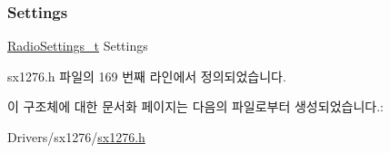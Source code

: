 \subsubsection{\texorpdfstring{Settings}{Settings}}
{\footnotesize\ttfamily \mbox{\hyperlink{struct_radio_settings__t}{Radio\+Settings\+\_\+t}} Settings}



sx1276.\+h 파일의 169 번째 라인에서 정의되었습니다.



이 구조체에 대한 문서화 페이지는 다음의 파일로부터 생성되었습니다.\+:\begin{DoxyCompactItemize}
\item 
Drivers/sx1276/\mbox{\hyperlink{sx1276_8h}{sx1276.\+h}}\end{DoxyCompactItemize}
